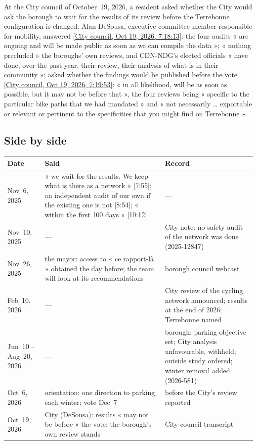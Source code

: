 \documentclass[11pt,letterpaper]{article}
\newcommand{\repourl}{https://github.com/OpenMobilityData/Terrebonne-open-sources}
\newcommand{\cliptime}[1]{\textsf{\small[#1]}}
\newcommand{\tr}[1]{\href{\repourl/blob/main/2026-10-19-city-council/2026-10-19_03.md}{\textsf{\small[City council, Oct 19, 2026, #1]}}}
\begin{document}
At the City council of October~19, 2026, a resident asked whether the City
would ask the borough to wait for the results of its review before the
Terrebonne configuration is changed. Alan DeSousa, executive committee member
responsible for mobility, answered \tr{7:18:13}: the four audits « are
ongoing and will be made public as soon as we can compile the data »; « nothing
precluded » the boroughs' own reviews, and CDN-NDG's elected officials « have
done, over the past year, their review, their analysis of what is in their
community »; asked whether the findings would be published before the vote
\tr{7:19:53}: « in all likelihood, will be as soon as possible, but it may not
be before that », the four reviews being « specific to the particular bike
paths that we had mandated » and « not necessarily … exportable or relevant
or pertinent to the specificities that you might find on Terrebonne ».

\subsection{Side by side}

\begin{small}
\begin{longtable}{>{\raggedright\arraybackslash}p{3.1cm}>{\raggedright\arraybackslash}p{5.6cm}>{\raggedright\arraybackslash}p{6.1cm}}
\toprule
Date & Said & Record \\
\midrule
\endhead
Nov~6, 2025 & « we wait for the results. We keep what is there as a network » \cliptime{7:55}; an independent audit of our own if the existing one is not \cliptime{8:54}; « within the first 100 days » \cliptime{10:12} & — \\
Nov~10, 2025 & — & City note: no safety audit of the network was done (2025-12847) \\
Nov~26, 2025 & the mayor: access to « ce rapport-là » obtained the day before; the team will look at its recommendations & borough council webcast \\
Feb~10, 2026 & — & City review of the cycling network announced; results at the end of 2026; Terrebonne named \\
Jun~10 -- Aug~20, 2026 & — & borough: parking objective set; City analysis unfavourable, withheld; outside study ordered; winter removal added (2026-581) \\
Oct~6, 2026 & orientation: one direction to parking each winter; vote Dec~7 & before the City's review reported \\
Oct~19, 2026 & City (DeSousa): results « may not be before » the vote; the borough's own review stands & City council transcript \\
\bottomrule
\end{longtable}
\end{small}
\end{document}
